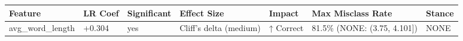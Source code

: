 \begin{tabular}{lllllll}
\toprule
Feature & LR Coef & Significant & Effect Size & Impact & Max Misclass Rate & Stance \\
\midrule
avg\_word\_length & +0.304 & yes & Cliff's delta (medium) & ↑ Correct & 81.5\% (NONE: (3.75, 4.101]) & NONE \\
\bottomrule
\end{tabular}

